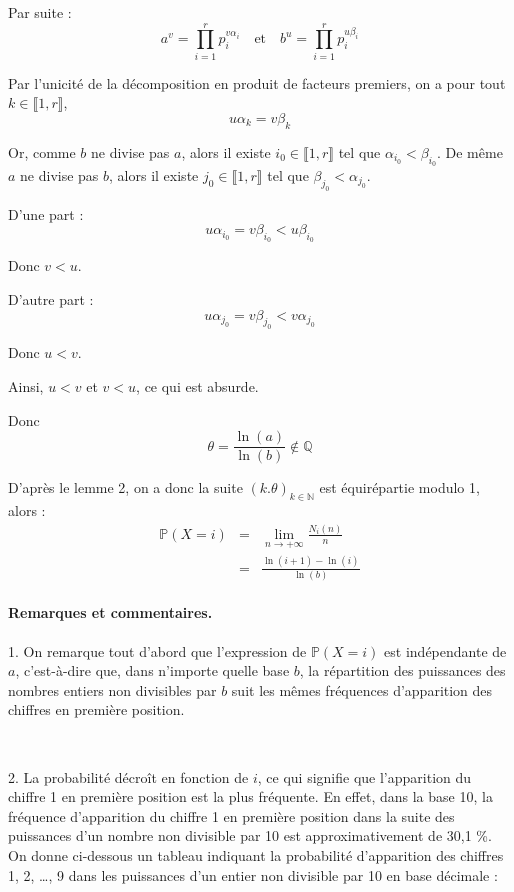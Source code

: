 Par suite :
\[ a^v = \prod_{i = 1}^r p_i^{v \alpha_i}  \quad \text{et} \quad b^u =
   \prod_{i = 1}^r p_i^{u \beta_i} \]


Par l'unicit{\'e} de la d{\'e}composition en produit de facteurs premiers, on
a pour tout $k \in \llbracket 1, r \rrbracket$,
\[ u \alpha_k = v \beta_k \]


Or, comme $b$ ne divise pas $a$, alors il existe $i_0 \in \llbracket 1, r
\rrbracket$ tel que $\alpha_{i_0} < \beta_{i_0}$. De m{\^e}me $a$ ne divise
pas $b$, alors il existe $j_0 \in \llbracket 1, r \rrbracket$ tel que
$\beta_{j_0} < \alpha_{j_0}$.

D'une part :
\[ u \alpha_{i_0} = v \beta_{i_0} < u \beta_{i_0} \]


Donc $v < u$.

D'autre part :
\[ u \alpha_{j_0} = v \beta_{j_0} < v \alpha_{j_0} \]


Donc $u < v$.

Ainsi, $u < v$ et $v < u$, ce qui est absurde.

Donc
\[ \theta = \frac{\ln (a)}{\ln (b)} \nin \mathbb{Q} \]


D'apr{\`e}s le lemme 2, on a donc la suite $(k. \theta)_{k \in \mathbb{N}}$
est {\'e}quir{\'e}partie modulo 1, alors :
\begin{eqnarray*}
  \mathbb{P} (X = i) & = & \underset{n \rightarrow + \infty}{\lim}  \frac{N_i
  (n)}{n}\\
  & = & \frac{\ln (i + 1) - \ln (i)}{\ln (b)}
\end{eqnarray*}


\paragraph{Remarques et commentaires.}

1. On remarque tout d'abord que l'expression de $\mathbb{P}(X = i)$ est
ind{\'e}pendante de $a$, c'est-{\`a}-dire que, dans n'importe quelle base $b$,
la r{\'e}partition des puissances des nombres entiers non divisibles par $b$
suit les m{\^e}mes fr{\'e}quences d'apparition des chiffres en premi{\`e}re
position.

\

2. La probabilit{\'e} d{\'e}cro{\^i}t en fonction de $i$, ce qui signifie que
l'apparition du chiffre 1 en premi{\`e}re position est la plus fr{\'e}quente.
En effet, dans la base 10, la fr{\'e}quence d'apparition du chiffre 1 en
premi{\`e}re position dans la suite des puissances d'un nombre non divisible
par 10 est approximativement de 30,1 \%. On donne ci-dessous un tableau
indiquant la probabilit{\'e} d'apparition des chiffres 1, 2, {\ldots}, 9 dans
les puissances d'un entier non divisible par 10 en base d{\'e}cimale :

